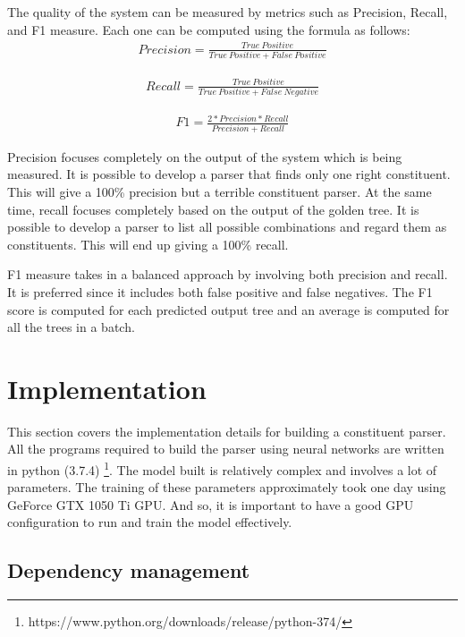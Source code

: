 \documentclass[a4paper, 11pt]{article}
\begin{document}
The quality of the system can be measured by metrics such as Precision, Recall, and F1 measure. Each one can be computed using the formula as follows:
\begin{align*}
Precision = \frac{True\ Positive} {True\ Positive + False\ Positive}
\end{align*}

\begin{align*}
Recall = \frac{True\ Positive} {True\ Positive + False\ Negative}
\end{align*}

\begin{align*}
F1 = \frac{2* Precision * Recall} {Precision + Recall}
\end{align*}

Precision focuses completely on the output of the system which is being measured. It is possible to develop a parser that finds only one right constituent. This will give a 100\% precision but a terrible constituent parser. At the same time, recall focuses completely based on the output of the golden tree. It is possible to develop a parser to list all possible combinations and regard them as constituents. This will end up giving a 100\% recall.

F1 measure takes in a balanced approach by involving both precision and recall. It is preferred since it includes both false positive and false negatives. The F1 score is computed for each predicted output tree and an average is computed for all the trees in a batch. 


\pagebreak
\section{Implementation}

This section covers the implementation details for building a constituent parser. All the programs required to build the parser using neural networks are written in python (3.7.4) \footnote{https://www.python.org/downloads/release/python-374/}. The model built is relatively complex and involves a lot of parameters. The training of these parameters approximately took one day using GeForce GTX 1050 Ti GPU. And so, it is important to have a good GPU configuration to run and train the model effectively. 
\subsection{Dependency management}
\end{document}
